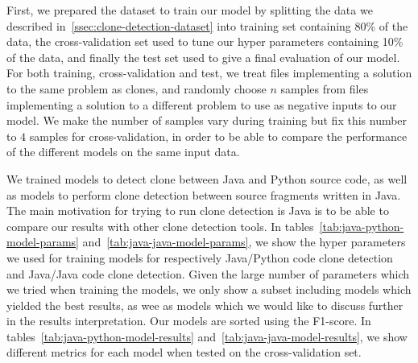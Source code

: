 First, we prepared the dataset to train our model by splitting the data we
described in~\ref{ssec:clone-detection-dataset} into training set containing
80\% of the data, the cross-validation set used to tune our hyper parameters
containing 10\% of the data, and finally the test set used to give a final
evaluation of our model. For both training, cross-validation and test, we treat
files implementing a solution to the same problem as clones, and randomly choose
$n$ samples from files implementing a solution to a different problem to use as
negative inputs to our model. We make the number of samples vary during training
but fix this number to $4$ samples for cross-validation, in order to be able to
compare the performance of the different models on the same input data.

We trained models to detect clone between Java and Python source code, as well
as models to perform clone detection between source fragments written in Java.
The main motivation for trying to run clone detection is Java is to be able to
compare our results with other clone detection tools. In
tables~\ref{tab:java-python-model-params} and~\ref{tab:java-java-model-params},
we show the hyper parameters we used for training models for respectively
Java/Python code clone detection and Java/Java code clone detection. Given the
large number of parameters which we tried when training the models, we only show
a subset including models which yielded the best results, as wee as models which
we would like to discuss further in the results interpretation. Our models are
sorted using the F1-score. In tables~\ref{tab:java-python-model-results}
and~\ref{tab:java-java-model-results}, we show different metrics for each model
when tested on the cross-validation set.


